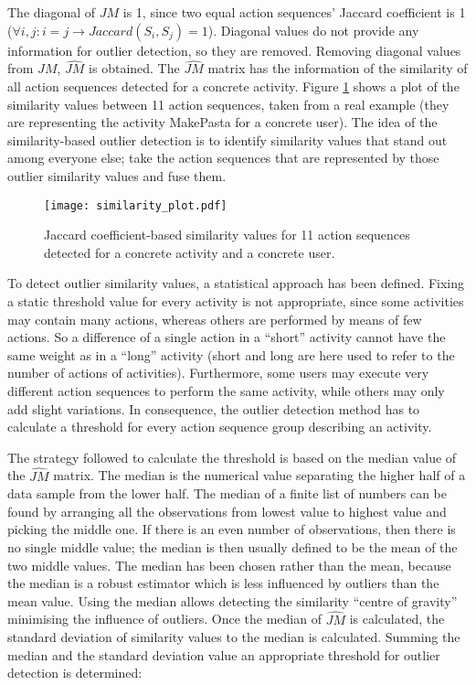 The diagonal of $JM$ is 1, since two equal action sequences' Jaccard coefficient is 1 ($\forall i, j : i = j \rightarrow Jaccard(S_i, S_j) = 1$). Diagonal values do not provide any information for outlier detection, so they are removed. Removing diagonal values from $JM$, $\hat{JM}$ is obtained. The $\hat{JM}$ matrix has the information of the similarity of all action sequences detected for a concrete activity. Figure \ref{fig-similarity} shows a plot of the similarity values between 11 action sequences, taken from a real example (they are representing the activity MakePasta for a concrete user). The idea of the similarity-based outlier detection is to identify similarity values that stand out among everyone else; take the action sequences that are represented by those outlier similarity values and fuse them.  

\begin{figure}[htbp]
\centering
\texttt{[image: similarity\_plot.pdf]}
    \caption{Jaccard coefficient-based similarity values for 11 action sequences detected for a concrete activity and a concrete user.}
    \label{fig-similarity}
\end{figure}

To detect outlier similarity values, a statistical approach has been defined. Fixing a static threshold value for every activity is not appropriate, since some activities may contain many actions, whereas others are performed by means of few actions. So a difference of a single action in a ``short'' activity cannot have the same weight as in a ``long'' activity (short and long are here used to refer to the number of actions of activities). Furthermore, some users may execute very different action sequences to perform the same activity, while others may only add slight variations. In consequence, the outlier detection method has to calculate a threshold for every action sequence group describing an activity. 

The strategy followed to calculate the threshold is based on the median value of the $\hat{JM}$ matrix. The median is the numerical value separating the higher half of a data sample from the lower half. The median of a finite list of numbers can be found by arranging all the observations from lowest value to highest value and picking the middle one. If there is an even number of observations, then there is no single middle value; the median is then usually defined to be the mean of the two middle values. The median has been chosen rather than the mean, because the median is a robust estimator which is less influenced by outliers than the mean value. Using the median allows detecting the similarity ``centre of gravity'' minimising the influence of outliers. Once the median of $\hat{JM}$ is calculated, the standard deviation of similarity values to the median is calculated. Summing the median and the standard deviation value an appropriate threshold for outlier detection is determined:

